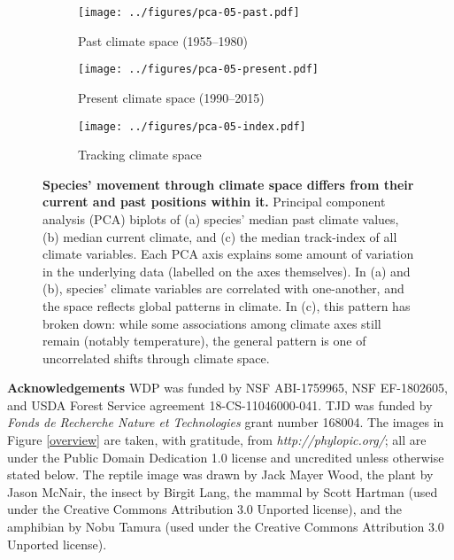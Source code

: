 \documentclass[12pt]{report}
\begin{document}
\clearpage
\begin{figure}[h!]
  \begin{center}
    \begin{subfigure}{.45\textwidth}
      \texttt{[image: ../figures/pca-05-past.pdf]}
      \caption{Past climate space (1955--1980)}
    \end{subfigure}
    \begin{subfigure}{.45\textwidth}
      \texttt{[image: ../figures/pca-05-present.pdf]}
      \caption{Present climate space (1990--2015)}
    \end{subfigure}
    \begin{subfigure}{.45\textwidth}
      \texttt{[image: ../figures/pca-05-index.pdf]}
      \caption{Tracking climate space}
    \end{subfigure}
  \end{center}
  \caption{\textbf{Species' movement through climate space differs
      from their current and past positions within it.}  Principal
    component analysis (PCA) biplots of (a) species' median past
    climate values, (b) median current climate, and (c) the median
    track-index of all climate variables. Each PCA axis explains some
    amount of variation in the underlying data (labelled on the axes
    themselves). In (a) and (b), species' climate variables are
    correlated with one-another, and the space reflects global
    patterns in climate. In (c), this pattern has broken down: while
    some associations among climate axes still remain (notably
    temperature), the general pattern is one of uncorrelated shifts
    through climate space.}
  \label{pca}
\end{figure}

\clearpage

\textbf{Acknowledgements} WDP was funded by NSF ABI-1759965, NSF
EF-1802605, and USDA Forest Service agreement 18-CS-11046000-041. TJD
was funded by \emph{Fonds de Recherche Nature et Technologies} grant
number 168004. The images in Figure \ref{overview} are taken, with
gratitude, from \emph{http://phylopic.org/}; all are under the Public
Domain Dedication 1.0 license and uncredited unless otherwise stated
below. The reptile image was drawn by Jack Mayer Wood, the plant by
Jason McNair, the insect by Birgit Lang, the mammal by Scott Hartman
(used under the Creative Commons Attribution 3.0 Unported license),
and the amphibian by Nobu Tamura (used under the Creative Commons
Attribution 3.0 Unported license).
\end{document}
